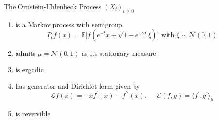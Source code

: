 \documentclass{article}
\begin{document}
  \begin{theorem}
  The Ornstein-Uhlenbeck Process $(X_t)_{t \geq 0}$ 
  \begin{enumerate}
      \item is a Markov process with semigroup 
      \[P_t f(x) = \mathbb{E} \big[ f(e^{-t} x + \sqrt{1 - e^{-2t}} \xi) \big] \text{ with } \xi \sim \mathcal{N}(0, 1)\]
      \item admits $\mu = \mathcal{N}(0, 1)$ as its stationary measure
      \item is ergodic
      \item has generator and Dirichlet form given by 
      \[\mathscr{L} f(x) = -x f^{\prime} (x) + f^{\prime\prime} (x), \;\;\;\;\; \mathcal{E}(f, g) = \langle f^\prime , g^\prime \rangle_\mu\]
      \item is reversible
  \end{enumerate}
  \end{theorem}
\end{document}

